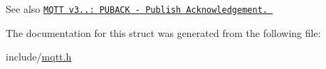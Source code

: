 \begin{DoxySeeAlso}{See also}
\href{http://docs.oasis-open.org/mqtt/mqtt/v3.1.1/os/mqtt-v3.1.1-os.html#_Toc398718043}{\tt M\+Q\+TT v3..\+: P\+U\+B\+A\+CK -\/ Publish Acknowledgement. } 
\end{DoxySeeAlso}


The documentation for this struct was generated from the following file\+:\begin{DoxyCompactItemize}
\item 
include/\hyperlink{mqtt_8h}{mqtt.\+h}\end{DoxyCompactItemize}
